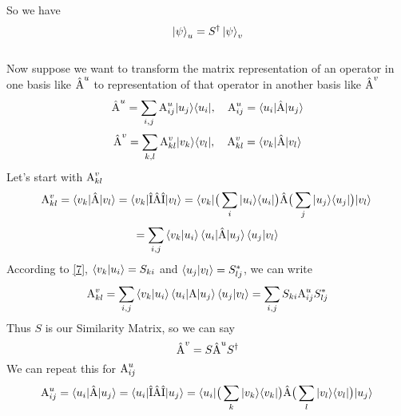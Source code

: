 \documentclass[12pt]{article}
\begin{document}
So we have
\begin{equation}
    \ket{\psi}_{u} = S^{\dagger}\ket{\psi}_{v}
\end{equation}
\\
Now suppose we want to transform the matrix representation of an operator in one basis like $\hat{\textnormal{A}}^{u}$ to representation of that operator in another basis
like $\hat{\textnormal{A}}^{v}$
\begin{equation}
    \label{7}
    \hat{\textnormal{A}}^{u} = \sum_{i,j}\textnormal{A}_{ij}^{u}|u_{j}\rangle \langle u_{i}|, \quad \textnormal{A}_{ij}^{u} = \braket{u_{i}|\hat{\textnormal{A}}|u_{j}}
\end{equation}
\begin{equation}
    \label{8}
    \hat{\textnormal{A}}^{v} = \sum_{k,l}\textnormal{A}_{kl}^{v}|v_{k}\rangle \langle v_{l}|, \quad \textnormal{A}_{kl}^{v} = \braket{v_{k}|\hat{\textnormal{A}}|v_{l}}
\end{equation}
Let's start with $\textnormal{A}_{kl}^{v}$
\begin{equation*}
    \textnormal{A}_{kl}^{v} = \braket{v_{k}|\hat{\textnormal{A}}|v_{l}} = \braket{v_{k}|\hat{\textnormal{I}}\hat{\textnormal{A}}\hat{\textnormal{I}}|v_{l}}
    = \braket{v_{k}|\big(\sum_{i} |u_{i}\rangle \langle u_{i}| \big)\hat{\textnormal{A}}\big(\sum_{j} |u_{j}\rangle \langle u_{j}| \big)|v_{l}} \\
\end{equation*}
\begin{equation*}
    = \sum_{i,j} \braket{v_{k}|u_{i}} \braket{u_{i}| \hat{\textnormal{A}} | u_{j}} \braket{u_{j}| v_{l}}
\end{equation*}
According to \ref{7}, $\braket{v_{k}|u_{i}} = S_{ki}$ and $\braket{u_{j}| v_{l}} = S_{lj}^{*}$,
we can write
\begin{equation}
    \textnormal{A}_{kl}^{v} = \sum_{i,j} \braket{v_{k}|u_{i}} \braket{u_{i}| \textnormal{A} | u_{j}} \braket{u_{j}| v_{l}} = \sum_{i,j} S_{ki} \textnormal{A}_{ij}^{u} S_{lj}^{*}
\end{equation}
Thus $S$ is our Similarity Matrix, so we can say
\begin{equation}
    \hat{\textnormal{A}}^{v} = S\hat{\textnormal{A}}^{u}S^{\dagger}
\end{equation}
We can repeat this for $\textnormal{A}_{ij}^{u}$
\begin{equation*}
    \textnormal{A}_{ij}^{u} = \braket{u_{i}|\hat{\textnormal{A}}|u_{j}} = \braket{u_{i}|\hat{\textnormal{I}}\hat{\textnormal{A}}\hat{\textnormal{I}}|u_{j}}
    = \braket{u_{i}|\big(\sum_{k} |v_{k}\rangle \langle v_{k}| \big)\hat{\textnormal{A}}\big(\sum_{l} |v_{l}\rangle \langle v_{l}| \big)|u_{j}} \\
\end{equation*}
\end{document}
